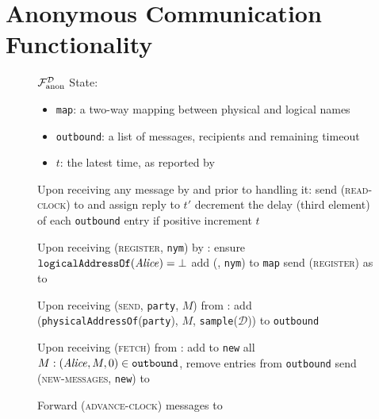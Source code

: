 \section{Anonymous Communication Functionality}
  \label{sec:fanon}
  \begin{figure}[H]
    \begin{systembox}{$\mathcal{F}_{\mathrm{anon}}^{\mathcal{D}}$} 
      State:
      \begin{itemize}
        \item \texttt{map}: a two-way mapping between physical and logical names
        \item \texttt{outbound}: a list of messages, recipients and remaining
        timeout
        \item $t$: the latest time, as reported by \gFclock
      \end{itemize}
      \begin{algorithmic}[1]
        \State Upon receiving any message by \alice and prior to handling it:
        \Indent
          \State send (\textsc{read-clock}) to \gFclock and assign reply to $t'$
            \State decrement the delay (third element) of each \texttt{outbound}
            entry if positive
            \State increment $t$
          \EndIf
        \EndIndent
        \Statex

        \State Upon receiving (\textsc{register}, \texttt{nym}) by \alice:
        \Indent
          \State ensure $\mathtt{logicalAddressOf}(\mathit{Alice}) = \bot$
          \State add (\alice, \texttt{nym}) to \texttt{map}
          \State send (\textsc{register}) as \alice to \gFclock
        \EndIndent
        \Statex

        \State Upon receiving (\textsc{send}, \texttt{party}, $M$) from \alice:
        \Indent
          \State add (\texttt{physicalAddressOf}(\texttt{party}), $M$,
          \texttt{sample}($\mathcal{D}$)) to \texttt{outbound} 
        \EndIndent
        \Statex

        \State Upon receiving (\textsc{fetch}) from \alice:
        \Indent
          \State add to \texttt{new} all $M: (\mathit{Alice}, M, 0) \in
          \mathtt{outbound}$, remove entries from \texttt{outbound}
          \State send (\textsc{new-messages}, \texttt{new}) to \alice
        \EndIndent
        \Statex

        \State Forward (\textsc{advance-clock}) messages to \gFclock
      \end{algorithmic}
    \end{systembox}
    \caption{}
    \label{alg:fanon}
  \end{figure}
